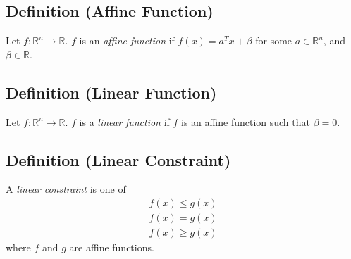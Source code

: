\subsection{Definition (Affine Function)}
Let $f:\mathbb{R}^n\rightarrow\mathbb{R}$. $f$ is an \emph{affine function} if
$f(x)=a^Tx+\beta$ for some $a\in\mathbb{R}^n$, and $\beta\in\mathbb{R}$.

\subsection{Definition (Linear Function)}
Let $f:\mathbb{R}^n\rightarrow\mathbb{R}$. $f$ is a \emph{linear function} if
$f$ is an affine function such that $\beta=0$.

\subsection{Definition (Linear Constraint)}
A \emph{linear constraint} is one of
\begin{align*}
    f(x)\le g(x)\\
    f(x)=g(x)\\
    f(x)\ge g(x)
\end{align*}
where $f$ and $g$ are affine functions.